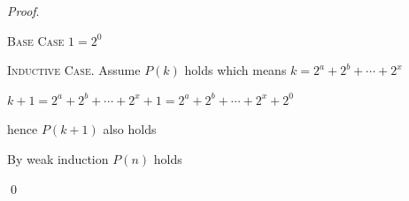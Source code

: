 
\textit{Proof}.

\textsc{Base Case}
$1 = 2^0$

\textsc{Inductive Case.}
Assume $P(k)$ holds which means $k = 2^a + 2^b + \cdots + 2^x$

$k + 1 = 2^a + 2^b + \cdots + 2^x + 1 = 2^a + 2^b + \cdots + 2^x + 2^0$

hence $P(k+1)$ also holds

By weak induction $P(n)$ holds

\qed
